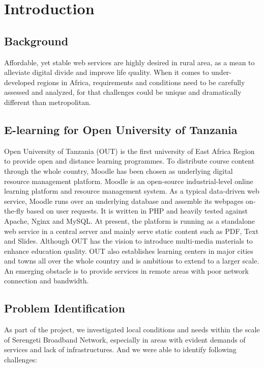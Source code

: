 \chapter{Introduction}
\section{Background}

Affordable, yet stable web services are highly desired in rural area, as a mean to alleviate digital divide and improve life quality. When it comes to under-developed regions in Africa, requirements and conditions need to be carefully assessed and analyzed, for that challenges could be unique and dramatically different than metropolitan.

\section{E-learning for Open University of Tanzania} \label{out_intro}
Open University of Tanzania (OUT) \cite{out} is the first university of East Africa Region to provide open and distance learning programmes. To distribute course content through the whole country, Moodle has been chosen as underlying digital resource management platform. Moodle\cite{moodle} is an open-source industrial-level online learning platform and resource management system. As a typical data-driven web service, Moodle runs over an underlying database and assemble its webpages on-the-fly based on user requests. It is written in PHP and heavily tested against Apache, Nginx and MySQL. At present, the platform is running as a standalone web service in a central server and mainly serve static content such as PDF, Text and Slides. Although OUT has the vision to introduce multi-media materials to enhance education quality. OUT also establishes learning centers in major cities and towns all over the whole country and is ambitious to extend to a larger scale. An emerging obstacle is to provide services in remote areas with poor network connection and bandwidth.

\section{Problem Identification}
As part of the project, we investigated local conditions and needs within the scale of Serengeti Broadband Network, especially in areas with evident demands of services and lack of infrastructures. And we were able to identify following challenges:


